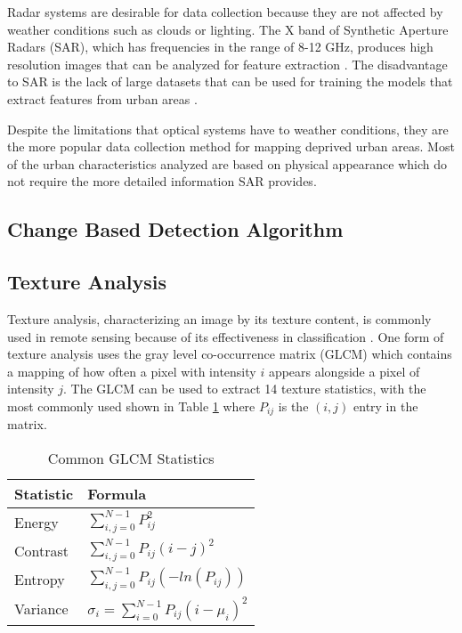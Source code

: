 \documentclass[conference]{IEEEtran}
\begin{document}
		Radar systems are desirable for data collection because they are not affected by weather conditions such as clouds or lighting.
		The X band of Synthetic Aperture Radars (SAR), which has frequencies in the range of 8-12 GHz, produces high resolution images that can be analyzed for feature extraction \cite{Wurm_2017}.
		The disadvantage to SAR is the lack of large datasets that can be used for training the models that extract features from urban areas \cite{Shi_Wenzhong_2020}.
		
		Despite the limitations that optical systems have to weather conditions, they are the more popular data collection method for mapping deprived urban areas.
		Most of the urban characteristics analyzed are based on physical appearance which do not require the more detailed information SAR provides. 


	\subsection{Change Based Detection Algorithm}
		
	\subsection{Texture Analysis}
		Texture analysis, characterizing an image by its texture content, is commonly used in remote sensing because of its effectiveness in classification \cite{Huang_2014}.
		One form of texture analysis uses the gray level co-occurrence matrix (GLCM) which contains a mapping of how often a pixel with intensity $i$ appears alongside a pixel of intensity $j$.
		The GLCM can be used to extract 14 texture statistics, with the most commonly used shown in Table \ref{tab:glcm_formulas} where $P_{ij}$ is the $(i,j)$ entry in the matrix. 
		
		\begin{table}[htbp]
			\caption{Common GLCM Statistics}
			\centering
			\begin{tabular}{ll} %
				\\[1ex]
				Statistic & Formula \\ %
				\hline\hline %
				Energy & $\displaystyle\sum_{i,j=0}^{N-1} P_{ij}^2$ \\
				Contrast & $\displaystyle\sum_{i,j=0}^{N-1} P_{ij}(i-j)^2$ \\
				Entropy & $\displaystyle\sum_{i,j=0}^{N-1} P_{ij}(-ln(P_{ij}))$ \\
				Variance & $\sigma_i = \displaystyle\sum_{i=0}^{N-1} P_{ij}(i-\mu_i)^2$ \\[1ex] %
				\hline %
			\end{tabular}
			\label{tab:glcm_formulas}
		\end{table}
		
\end{document}
